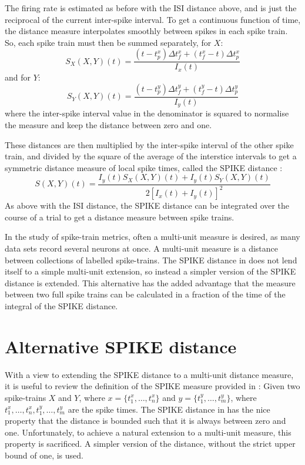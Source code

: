 The firing rate is estimated as before with the ISI distance above, and is just the reciprocal of the current inter-spike interval.  To get a continuous function of time, the distance measure interpolates smoothly between spikes in each spike train. So, each spike train must then be summed separately, for $X$:
\begin{equation}
S_X(X,Y)(t) = \frac{(t-t^x_p)\Delta t^x_f + (t^x_f - t)\Delta t^x_p}{I_x(t)}
\end{equation}
and for $Y$:
\begin{equation}
S_Y(X,Y)(t) = \frac{(t-t^y_p)\Delta t^y_f + (t^y_f - t)\Delta t^y_p}{I_y(t)}
\end{equation}
where the inter-spike interval value in the denominator is squared to normalise the measure and keep the distance between zero and one.

These distances are then multiplied by the inter-spike interval of the other spike train, and divided by the square of the average of the interstice intervals to get a symmetric distance measure of local spike times, called the SPIKE distance \citep{KreuzEtAl2012a}:
\begin{equation}
S(X,Y)(t) =  \frac{I_y(t)S_X(X,Y)(t) + I_y(t)S_Y(X,Y)(t)}{2[I_x(t) + I_y(t)]^2}
\end{equation}
As above with the ISI distance, the SPIKE distance can be integrated over the course of a trial to get a distance measure between spike trains.

In the study of spike-train metrics, often a multi-unit measure is desired, as many data sets record several neurons at once.  A multi-unit measure is a distance between collections of labelled spike-trains.  The SPIKE distance in \citep{KreuzEtAl2011a} does not lend itself to a simple multi-unit extension, so instead a simpler version of the SPIKE distance is extended.  This alternative has the added advantage that the measure between two full spike trains can be calculated in a fraction of the time of the integral of the SPIKE distance.

\section{Alternative SPIKE distance}
With a view to extending the SPIKE distance to a multi-unit distance measure, it is useful to review the definition of the SPIKE measure provided in \citep{KreuzEtAl2011a}:  Given two spike-trains $X$ and $Y$, where $x = \{ t_1^x, \ldots, t_n^x \}$ and $y = \{ t_1^y, \ldots , t_m^y\}$, where $t_1^x,\ldots,t_n^x,t_1^y,\ldots,t_m^y$ are the spike times.  The SPIKE distance in \citep{KreuzEtAl2011a} has the nice property that the distance is bounded such that it is always between zero and one.  Unfortunately, to achieve a natural extension to a multi-unit measure, this property is sacrificed.  A simpler version of the distance, without the strict upper bound of one, is used.

